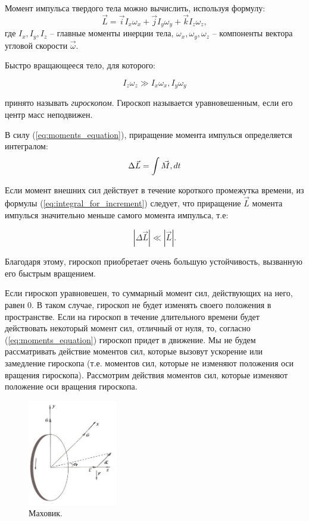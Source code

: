 \documentclass[a4paper,12pt]{article}
\begin{document}
Момент импульса твердого тела можно вычислить, используя формулу:
\begin{equation}
	\vec{L} = \vec{i}I_{x}\omega_{x} + \vec{j}I_{y}\omega_{y} + \vec{k}I_{z}\omega_{z},
\end{equation}
где $ I_{x},I_{y},I_{z} $ -- главные моменты инерции тела, $ \omega_{x}, \omega_{y}, \omega_{z} $ -- компоненты вектора угловой скорости  $\vec{\omega} $.

Быстро вращающееся тело, для которого:

	$$I_{z}\omega_{z} \gg I_{x}\omega_{x}, I_{y}\omega_{y}$$

принято называть \textit{гироскопом}. Гироскоп называется уравновешенным, если его центр масс неподвижен.

В силу (\ref{eq:moments_equation}), приращение момента импулься определяется интегралом:
\begin{equation}
	\Delta\vec{L} =  \int\vec{M}\\,dt
	\label{eq:integral_for_increment}
\end{equation}

Если момент внешних сил действует в течение короткого промежутка времени, из формулы (\ref{eq:integral_for_increment}) следует, что приращение $\vec{L}$ момента импулься значительно меньше самого момента импульса, т.е:

$$
	\left| \Delta\vec{L} \right| \ll \left| \vec{L} \right|.
$$

Благодаря этому, гироскоп приобретает очень большую устойчивость, вызванную его быстрым вращением.

Если гироскоп уравновешен, то суммарный момент сил, действующих на него, равен 0. В таком случае, гироскоп не будет изменять своего положения в пространстве. Если на гироскоп в течение длительного времени будет действовать некоторый момент сил, отличный от нуля, то, согласно (\ref{eq:moments_equation}) гироскоп придет в движение. Мы не будем рассматривать действие моментов сил, которые вызовут ускорение или замедление гироскопа (т.е. моментов сил, которые не изменяют положения оси вращения гироскопа). Рассмотрим действия моментов сил, которые изменяют положение оси вращения гироскопа.

\begin{figure}
	\vspace{-2.5ex}
	\includegraphics[width = 0.35\textwidth]{flywheel}
	\caption{Маховик.}
	\label{fig:flywheel}
\end{figure}
\end{document}
